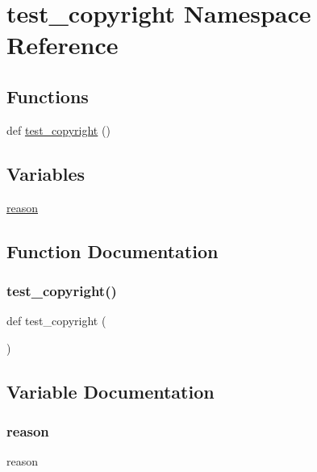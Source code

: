 \hypertarget{namespacetest__copyright}{}\section{test\+\_\+copyright Namespace Reference}
\label{namespacetest__copyright}
\subsection*{Functions}
\begin{DoxyCompactItemize}
\item 
def \mbox{\hyperlink{namespacetest__copyright_a8a84d20ba752db6658b7e7539b9a4d4c}{test\+\_\+copyright}} ()
\end{DoxyCompactItemize}
\subsection*{Variables}
\begin{DoxyCompactItemize}
\item 
\mbox{\hyperlink{namespacetest__copyright_a144a3f0ab0553569e546510e66e93766}{reason}}
\end{DoxyCompactItemize}


\subsection{Function Documentation}
\mbox{\label{namespacetest__copyright_a8a84d20ba752db6658b7e7539b9a4d4c}} 
\subsubsection{\texorpdfstring{test\+\_\+copyright()}{test\_copyright()}}
{\footnotesize\ttfamily def test\+\_\+copyright (\begin{DoxyParamCaption}{ }\end{DoxyParamCaption})}



\subsection{Variable Documentation}
\mbox{\label{namespacetest__copyright_a144a3f0ab0553569e546510e66e93766}} 
\subsubsection{\texorpdfstring{reason}{reason}}
{\footnotesize\ttfamily reason}

